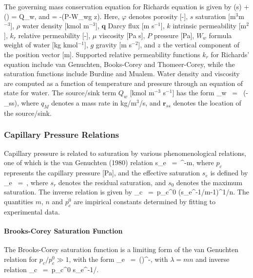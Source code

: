 \documentclass[12pt]{article}
\def\EQ#1\EN{\begin{equation}#1\end{equation}}
\newcommand{\eq}{\ =\ }
\newcommand{\p}{{\partial}}
\newcommand{\bnabla}{\boldsymbol{\nabla}}
\newcommand{\bq}{\boldsymbol{q}}
\newcommand{\br}{\boldsymbol{r}}
\begin{document}
The governing mass conservation equation for Richards equation is given by
\EQ
\frac{\p}{\p t}\left(\varphi s\rho\right) + \bnabla\cdot\left(\rho\bq\right) = Q_w,
\EN
and
\EQ
\bq = -\bnabla\left(P-W_w\rho g z\right).
\EN
Here, $\varphi$ denotes porosity [-], 
$s$ saturation [m$^3$m$^{-3}$], 
$\rho$ water density [kmol m$^{-3}$], 
$\bq$ Darcy flux [m s$^{-1}$], 
$k$ intrinsic permeability [m$^2$], 
$k_r$ relative permeability [-], 
$\mu$ viscosity [Pa s], 
$P$ pressure [Pa], 
$W_w$ formula weight of water [kg kmol$^{-1}$], 
$g$ gravity [m s$^{-2}$], and 
$z$ the vertical component of the position vector [m].  
Supported relative permeability functions $k_r$ for Richards' equation include van Genuchten, Books-Corey and Thomeer-Corey, while the saturation functions include Burdine and Mualem.  Water density and viscosity are computed as a function of temperature and pressure through an equation of state for water. The source/sink term $Q_w$ [kmol m$^{-3}$ s$^{-1}$] has the form
\EQ
Q_w \eq {} \delta(\br-\br_{ss}),
\EN
where $q_M$ denotes a mass rate in kg/m$^{3}$/s, and $\br_{ss}$ denotes the location of the source/sink.

\subsubsection{Capillary Pressure Relations}

Capillary pressure is related to saturation by various 
phenomenological relations, one of which is the van Genuchten 
(1980) relation 
\EQ\label{seff}
s_e \eq {}^{-m}, 
\EN 
where $p_c$ represents the capillary pressure [Pa], and the effective saturation $s_e$ is defined by 
\EQ 
s_e \eq {}, 
\EN 
where $s_r$ denotes the residual saturation, and $s_0$ denotes 
the maximum saturation. 
The inverse relation is given by
\EQ
p_c \eq p_c^0 \left(s_e^{-1/m}-1\right)^{1/n}.
\EN
The quantities $m$, $n$ and $p_c^0$ are impirical constants determined by fitting to experimental data.

\paragraph{Brooks-Corey Saturation Function} 

The Brooks-Corey saturation function is a limiting form of the van Genuchten relation for $p_c/p_c^0 \gg 1$, with the form
\EQ
s_e \eq \left(\right)^{-\lambda},
\EN
with $\lambda=mn$ and inverse relation
\EQ
p_c \eq p_c^0 s_e^{-1/\lambda}.
\EN
\end{document}
